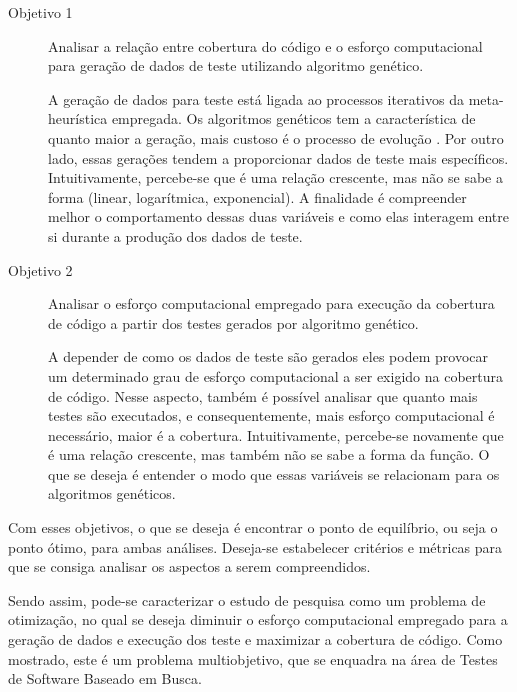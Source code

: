 \makeatletter
\def\namedlabel#1#2{\begingroup
    #2%
    \def\@currentlabel{#2}%
    \label{#1}\endgroup
}
\begin{description}
\item[\namedlabel{obj1}{Objetivo 1}] Analisar a relação entre cobertura do código e o esforço computacional para geração de dados de teste utilizando algoritmo genético.

A geração de dados para teste está ligada ao processos iterativos da meta-heurística empregada. Os algoritmos genéticos tem a característica de quanto maior a geração, mais custoso é o processo de evolução \cite{pargas1999test}. Por outro lado, essas gerações tendem a proporcionar dados de teste mais específicos. Intuitivamente, percebe-se que é uma relação crescente, mas não se sabe a forma (linear, logarítmica, exponencial). A finalidade é compreender melhor o comportamento dessas duas variáveis e como elas interagem entre si durante a produção dos dados de teste. 
		

\item[\namedlabel{obj2}{Objetivo 2}] Analisar o esforço computacional empregado para execução da cobertura de código a partir dos testes gerados por algoritmo genético.

A depender de como os dados de teste são gerados eles podem provocar um determinado grau de esforço computacional a ser exigido na cobertura de código. Nesse aspecto, também é possível analisar que quanto mais testes são executados, e consequentemente, mais esforço computacional é necessário, maior é a cobertura. Intuitivamente, percebe-se novamente que é uma relação crescente, mas também não se sabe a forma da função. O que se deseja é entender o modo que essas variáveis se relacionam para os algoritmos genéticos.

\end{description}

Com esses objetivos, o que se deseja é encontrar o ponto de equilíbrio, ou seja o ponto ótimo, para ambas análises. Deseja-se estabelecer critérios e métricas para que se consiga analisar os aspectos a serem compreendidos. 

Sendo assim, pode-se caracterizar o estudo de pesquisa como um problema de otimização, no qual se deseja diminuir o esforço computacional empregado para a geração de dados e execução dos teste e maximizar a cobertura de código. Como mostrado, este é um problema multiobjetivo, que se enquadra na área de Testes de Software Baseado em Busca.

